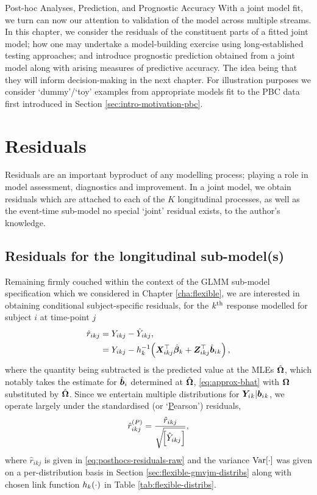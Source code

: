 \begin{chapter}{\label{cha:posthoc}Post-hoc Analyses, Prediction, and Prognostic Accuracy}
With a joint model fit, we turn can now our attention to validation of the model across multiple streams. In this chapter, we consider the residuals of the constituent parts of a fitted joint model; how one may undertake a model-building exercise using long-established testing approaches; and introduce prognostic prediction obtained from a joint model along with arising measures of predictive accuracy. The idea being that they will inform decision-making in the next chapter. For illustration purposes we consider `dummy'/`toy' examples from appropriate models fit to the PBC data first introduced in Section \ref{sec:intro-motivation-pbc}. 

\section{Residuals}\label{sec:posthoc-residuals-intro}
Residuals are an important byproduct of any modelling process; playing a role in model assessment, diagnostics and improvement. In a joint model, we obtain residuals which are attached to each of the $K$ longitudinal processes, as well as the event-time sub-model \ie no special `joint' residual exists, to the author's knowledge.
\subsection{Residuals for the longitudinal sub-model(s)}\label{sec:posthoc-residuals-long}
Remaining firmly couched within the context of the GLMM sub-model specification which we considered in Chapter \ref{cha:flexible}, we are interested in obtaining conditional subject-specific residuals, for the $k^{\text{th}}$ response modelled for subject $i$ at time-point $j$
\begin{equation}
    \begin{aligned}
        \hat{r}_{ikj} &= Y_{ikj} - \hat{Y}_{ikj},\\
        &= Y_{ikj} - h_k^{-1}\!\left(\bm{X}_{ikj}^\top\hat{\bm{\beta}}_k+\bm{Z}_{ikj}^\top\hat{\bm{b}}_i{_k}\right),
    \end{aligned}
\label{eq:posthocs-residuals-raw}
\end{equation}
where the quantity being subtracted is the predicted value at the MLEs $\hat{\bm{\Omega}}$, which notably takes the estimate for $\hat{\bm{b}}_i$ determined at $\hat{\bm{\Omega}}$, \ie \eqref{eq:approx-bhat} with $\bm{\mathrm{\Omega}}$ substituted by $\hat{\bm{\Omega}}$. Since we entertain multiple distributions for $\bm{Y}_i{_k}|\bm{b}_i{_k}$, we operate largely under the standardised (or `\underline{P}earson') residuals, 
\begin{align}
    \hat{r}_{ikj}^{(P)}=\frac{\hat{r}_{ikj}}{\sqrt{\!\left[\hat{Y}_{ikj}\right]}},
\label{eq:posthocs-residuals-pearson}
\end{align}
where $\hat{r}_{ikj}$ is given in \eqref{eq:posthocs-residuals-raw} and the variance $\mathrm{Var}\!\left[\cdot\right]$ was given on a per-distribution basis in Section \ref{sec:flexible-gmvjm-distribs} along with chosen link function $h_k\!\left(\cdot\right)$ in Table \ref{tab:flexible-distribs}.


\end{chapter}

